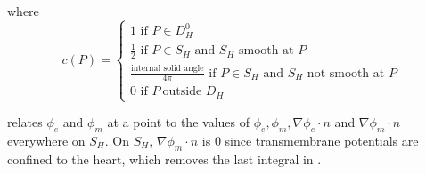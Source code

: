 where 
\begin{equation}
c(P)=\left\{ 
\begin{array}{l}
1\text{ if }P\in D_{H}^{0} \\ 
\frac{1}{2}\text{ if }P\in S_{H}\text{ and }S_{H}\text{ smooth at }P \\ 
\frac{\text{internal solid angle}}{4\pi }\text{ if }P\in S_{H}\text{ and }%
S_{H}\text{ not smooth at }P \\ 
0\text{ if }P\ \text{outside }D_{H}
\end{array}
\right.  \label{cp}
\end{equation}

 relates $\phi _{e}$ and $\phi _{m}$ at a
point to the values of $\phi _{e},\phi _{m},\nabla \phi _{e}\cdot n$ and $%
\nabla \phi _{m}\cdot n$ everywhere on $S_{H}$.  
On $S_{H}$, $\nabla \phi_{m}\cdot n$ is $0$ since transmembrane potentials are
confined to the heart, which removes the last integral in .

